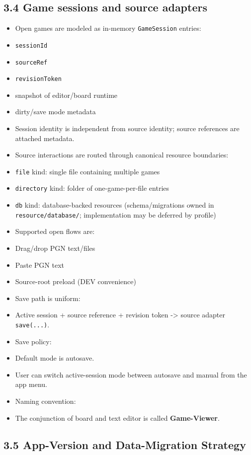 \documentclass[]{article}
\providecommand{\tightlist}{%
  \setlength{\itemsep}{0pt}\setlength{\parskip}{0pt}}
\begin{document}
\subsection{3.4 Game sessions and source
adapters}\label{game-sessions-and-source-adapters}

\begin{itemize}
\tightlist
\item
  Open games are modeled as in-memory \texttt{GameSession} entries:
\item
  \texttt{sessionId}
\item
  \texttt{sourceRef}
\item
  \texttt{revisionToken}
\item
  snapshot of editor/board runtime
\item
  dirty/save mode metadata
\item
  Session identity is independent from source identity; source
  references are attached metadata.
\item
  Source interactions are routed through canonical resource boundaries:
\item
  \texttt{file} kind: single file containing multiple games
\item
  \texttt{directory} kind: folder of one-game-per-file entries
\item
  \texttt{db} kind: database-backed resources (schema/migrations owned
  in \texttt{resource/database/}; implementation may be deferred by
  profile)
\item
  Supported open flows are:
\item
  Drag/drop PGN text/files
\item
  Paste PGN text
\item
  Source-root preload (DEV convenience)
\item
  Save path is uniform:
\item
  Active session + source reference + revision token -\textgreater{}
  source adapter \texttt{save(...)}.
\item
  Save policy:
\item
  Default mode is autosave.
\item
  User can switch active-session mode between autosave and manual from
  the app menu.
\item
  Naming convention:
\item
  The conjunction of board and text editor is called
  \textbf{Game-Viewer}.
\end{itemize}

\subsection{3.5 App-Version and Data-Migration
Strategy}\label{app-version-and-data-migration-strategy}
\end{document}
